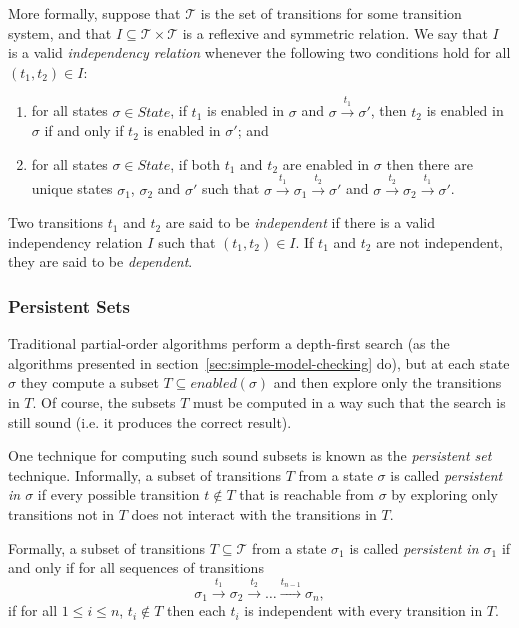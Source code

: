 \documentclass[12pt,a4paper,twoside,openright]{report}
\begin{document}
More formally, suppose that $\mathcal{T}$ is the set of
transitions for some transition system, and
that $I \subseteq \mathcal{T} \times \mathcal{T}$
is a reflexive and symmetric relation. We say
that $I$ is a valid \emph{independency relation}
whenever the following two conditions hold for
all $(t_1, t_2) \in I$:
\begin{enumerate}
	\item for all states $\sigma \in \textit{State}$,
		if $t_1$ is enabled in $\sigma$ and
		$\sigma \xrightarrow{t_1} \sigma'$, then
		$t_2$ is enabled in $\sigma$ if and only if
		$t_2$ is enabled in $\sigma'$; and
	\item for all states $\sigma \in \textit{State}$,
		if both $t_1$ and $t_2$ are enabled in $\sigma$
		then there are unique states $\sigma_1$, $\sigma_2$ and
		$\sigma'$ such that
		$\sigma \xrightarrow{t_1} \sigma_1 \xrightarrow{t_2} \sigma'$
		and
		$\sigma \xrightarrow{t_2} \sigma_2 \xrightarrow{t_1} \sigma'$.
\end{enumerate}
Two transitions $t_1$ and $t_2$ are said to be \emph{independent}
if there is a valid independency relation $I$ such that $(t_1, t_2) \in I$.
If $t_1$ and $t_2$ are not independent, they are said to be \emph{dependent}.

\subsubsection{Persistent Sets}
Traditional partial-order algorithms perform a depth-first
search (as the algorithms presented in
section~\ref{sec:simple-model-checking} do), but at each
state $\sigma$ they compute a subset
$T \subseteq \textit{enabled}(\sigma)$ and then explore
only the transitions in $T$. Of course, the subsets
$T$ must be computed in a way such that the search
is still sound (i.e. it produces the correct result).

One technique for computing such sound subsets is known
as the \emph{persistent set} technique. Informally,
a subset of transitions $T$ from a state $\sigma$
is called \emph{persistent in $\sigma$} if every
possible transition $t \not \in T$ that is reachable
from $\sigma$ by exploring only transitions not in
$T$ does not interact with the transitions
in $T$.

Formally, a subset of transitions $T \subseteq \mathcal{T}$
from a state $\sigma_1$
is called \emph{persistent in $\sigma_1$} if and only if
for all sequences of transitions
\[
	\sigma_1 \xrightarrow{\ t_1\ } \sigma_2 \xrightarrow{\ t_2\ } \ldots
	\xrightarrow{t_{n-1}} \sigma_n,
\]
if for all $1 \leq i \leq n$, $t_i \not \in T$ then each $t_i$ is
independent with every transition in $T$.
\end{document}
